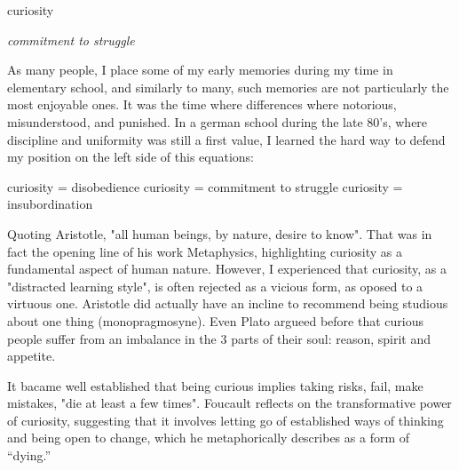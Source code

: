 


\begin{center}
\vspace*{\fill}
\Huge{curiosity}

\vspace{2cm}

\begin{flushright}
\large{
\textit{commitment to struggle}}
\end{flushright}

\vspace*{\fill}
\end{center}

As many people, I place some of my early memories during my time in elementary school, and similarly to many, such memories are not particularly the most enjoyable ones. It was the time where differences where notorious, misunderstood, and punished. In a german school during the late 80's, where discipline and uniformity was still a first value, I learned the hard way to defend my position on the left side of this equations: 

curiosity = disobedience
curiosity = commitment to struggle %
curiosity = insubordination

Quoting Aristotle, "all human beings, by nature, desire to know". That was in fact the opening line of his work Metaphysics, highlighting curiosity as a fundamental aspect of human nature.  However, I experienced that curiosity, as a "distracted learning style", is often rejected as a vicious form, as oposed to a virtuous one. Aristotle did actually have an incline to recommend being studious about one thing (monopragmosyne). Even Plato argueed before that curious people suffer from an imbalance in the 3 parts of their soul: reason, spirit and appetite. \citep{perry}

It bacame well established that being curious implies taking risks, fail, make mistakes, "die at least a few times". \citep{foucault1980masked} Foucault reflects on the transformative power of curiosity, suggesting that it involves letting go of established ways of thinking and being open to change, which he metaphorically describes as a form of “dying.”



